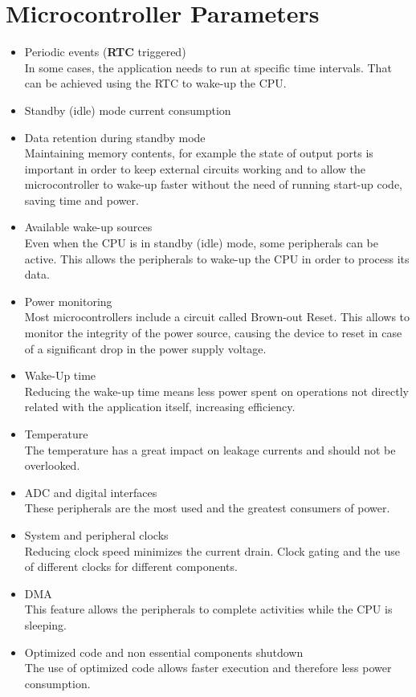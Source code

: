 \documentclass[11pt,a4paper]{report}
\begin{document}
\section{Microcontroller Parameters}
\begin{itemize}
\item Periodic events (\textbf{RTC} triggered)\\
In some cases, the application needs to run at specific time intervals. That can be achieved using the RTC to wake-up the CPU.
\item Standby (idle) mode current consumption
\item Data retention during standby mode\\
Maintaining memory contents, for example the state of output ports is important in order to keep external circuits working and to allow the microcontroller to wake-up faster without the need of running start-up code, saving time and power.
\item Available wake-up sources\\
Even when the CPU is in standby (idle) mode, some peripherals can be active. This allows the peripherals to wake-up the CPU in order to process its data.
\item Power monitoring \\
Most microcontrollers include a circuit called 
Brown-out Reset. This allows to monitor the integrity of the power source, 
causing the device to reset in case of a significant drop in the power supply voltage.
\item Wake-Up time\\
Reducing the wake-up time means less power spent on operations not directly related with the application itself, increasing efficiency.
\item Temperature\\
The temperature has a great impact on leakage currents and should not be overlooked.
\item ADC and digital interfaces\\
These peripherals are the most used and the greatest consumers of power. 
\item System and peripheral clocks\cite{atmelinnovative}\\
Reducing clock speed minimizes the current drain. Clock gating and the use of different clocks for different components.
\item DMA\\
This feature allows the peripherals to complete activities while the CPU is sleeping.
\item Optimized code and non essential components shutdown \\
The use of optimized code allows faster execution and therefore less power consumption.\cite{tipsntricks}
\end{itemize}





\end{document}

